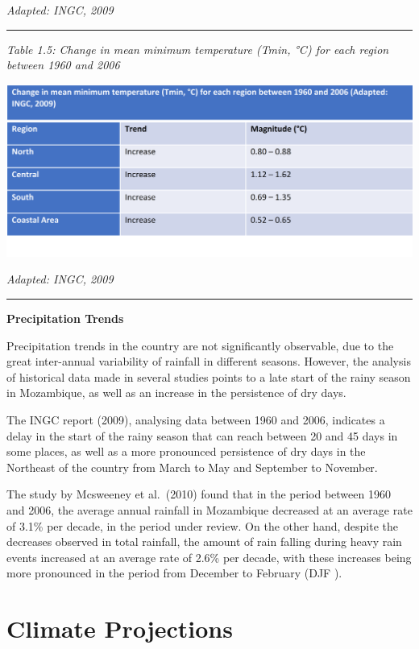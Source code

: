 \documentclass[
]{book}
\begin{document}
\emph{Adapted: INGC, 2009}

\begin{center}\rule{0.5\linewidth}{0.5pt}\end{center}

\emph{Table 1.5: Change in mean minimum temperature (Tmin, °C) for each region between 1960 and 2006}

\includegraphics{Figure17.png}

\emph{Adapted: INGC, 2009}

\begin{center}\rule{0.5\linewidth}{0.5pt}\end{center}

\textbf{Precipitation Trends}

Precipitation trends in the country are not significantly observable, due to the great inter-annual variability of rainfall in different seasons. However, the analysis of historical data made in several studies points to a late start of the rainy season in Mozambique, as well as an increase in the persistence of dry days.

The INGC report (2009), analysing data between 1960 and 2006, indicates a delay in the start of the rainy season that can reach between 20 and 45 days in some places, as well as a more pronounced persistence of dry days in the Northeast of the country from March to May and September to November.

The study by Mcsweeney et al.~(2010) found that in the period between 1960 and 2006, the average annual rainfall in Mozambique decreased at an average rate of 3.1\% per decade, in the period under review. On the other hand, despite the decreases observed in total rainfall, the amount of rain falling during heavy rain events increased at an average rate of 2.6\% per decade, with these increases being more pronounced in the period from December to February (DJF ).

\hypertarget{climate-projections}{%
\section{Climate Projections}\label{climate-projections}}
\end{document}
